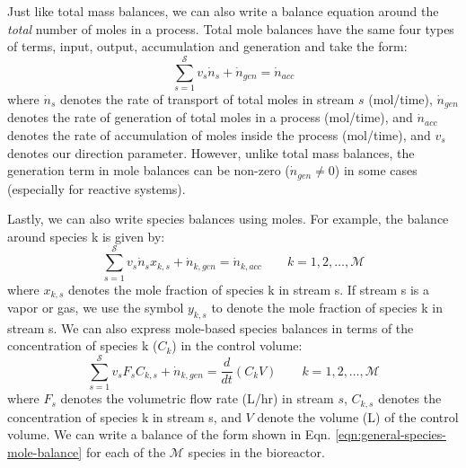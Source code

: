 \documentclass[11pt]{article}
\theoremstyle{definition}
\begin{document}
Just like total mass balances, we can also write a balance equation around the \textit{total} number of moles in a process.
Total mole balances have the same four types of terms, input, output, accumulation and generation and take the form:
\begin{equation}
\sum_{s = 1}^{\mathcal{S}}v_{s}\dot{n}_{s}+\dot{n}_{gen} = \dot{n}_{acc}
\end{equation}where $\dot{n}_{s}$ denotes the rate of transport of total moles in stream $s$ (mol/time), $\dot{n}_{gen}$ denotes the rate of generation of total moles in a process (mol/time),
and $\dot{n}_{acc}$ denotes the rate of accumulation of moles inside the process (mol/time), and $v_{s}$ denotes our direction parameter.
However, unlike total mass balances, the generation term in mole balances can be non-zero ($\dot{n}_{gen}\neq{0}$) in some cases (especially for reactive systems).

Lastly, we can also write species balances using moles. For example, the balance around species k is given by:
\begin{equation}
	\sum_{s = 1}^{\mathcal{S}}v_{s}\dot{n}_{s}x_{k,s}+\dot{n}_{k,gen}=  \dot{n}_{k,acc}\qquad{k=1,2,\hdots,\mathcal{M}}
\end{equation}where $x_{k,s}$ denotes the mole fraction of species k in stream s.
If stream s is a vapor or gas, we use the symbol $y_{k,s}$ to denote the mole fraction of species k in stream s.
We can also express mole-based species balances in terms of the concentration of species k ($C_{k}$) in the control volume:
\begin{equation}\label{eqn:general-species-mole-balance}
\sum_{s = 1}^{\mathcal{S}}v_{s}F_{s}C_{k,s} + \dot{n}_{k,gen} = \frac{d}{dt}\left(C_{k}V\right)\qquad{k=1,2,\hdots,\mathcal{M}}
\end{equation}where $F_{s}$ denotes the volumetric flow rate (L/hr) in stream $s$, $C_{k,s}$ denotes the concentration of species k in stream s, and $V$ denote the volume (L) of the control volume.
We can write a balance of the form shown in Eqn. \eqref{eqn:general-species-mole-balance} for each of the $\mathcal{M}$ species in the bioreactor.
\end{document}
